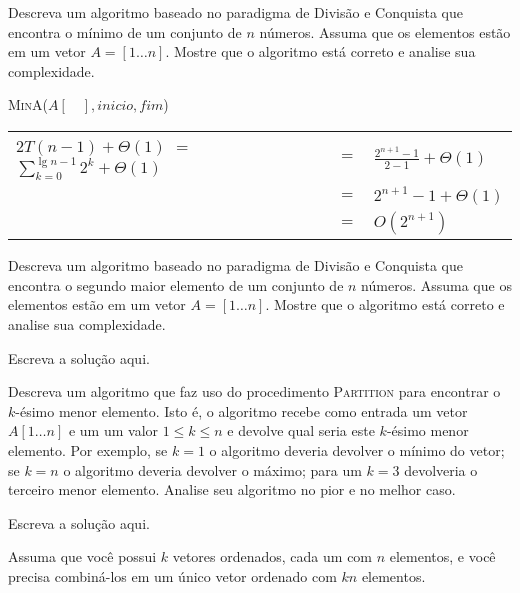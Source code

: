 \documentclass[a4paper]{exam}
\begin{document}
\begin{questions}
  \question Descreva um algoritmo baseado no paradigma de Divisão
  e Conquista que encontra o mínimo de um conjunto de $n$ números.
  Assuma que os elementos estão em um vetor $A = [1\ldots n]$.
  Mostre que o algoritmo está correto e analise sua complexidade.
  \begin{solution}
    \begin{algorithm}[H]
      \NoCaptionOfAlgo
      \DontPrintSemicolon
      \caption{\textsc{MinA}($A[\quad], inicio, fim$)}
    \end{algorithm}
    \begin{tabular}{lll}
        $2T(n-1) + \Theta(1)$ $=$
        $\displaystyle\sum_{k=0}^{\lg n - 1} 2^k + \Theta(1)$
        {}& $=$ &$ \frac{2^{n+1} - 1}{2 - 1} + \Theta(1)$ \\
        {}& $=$ &$ 2^{n+1} -1 + \Theta(1)$ \\
        {}& $=$ &$ O(2^{n+1})$ \\
    \end{tabular}   
  \end{solution}
  \question Descreva um algoritmo baseado no paradigma de Divisão
  e Conquista que encontra o segundo maior elemento de um conjunto
  de $n$ números. Assuma que os elementos estão
  em um vetor $A = [1\ldots n]$. Mostre que o algoritmo está
  correto e analise sua complexidade.
  \begin{solution}
    Escreva a solução aqui.
  \end{solution}
  \question Descreva um algoritmo que faz uso do procedimento
  \textsc{Partition} para encontrar o $k$-ésimo menor elemento.
  Isto é, o algoritmo recebe como entrada um vetor $A[1 \ldots n]$ e um
  um valor $1 \leq k \leq n$ e devolve qual seria este $k$-ésimo
  menor elemento. Por exemplo, se $k = 1$ o algoritmo deveria
  devolver o mínimo do vetor; se $k=n$ o algoritmo deveria devolver
  o máximo; para um $k=3$ devolveria o terceiro menor elemento.
  Analise seu algoritmo no pior e no melhor caso.
  \begin{solution}
    Escreva a solução aqui.
  \end{solution}
  \question Assuma que você possui $k$ vetores ordenados, cada um
  com $n$ elementos, e você precisa combiná-los em um único vetor
  ordenado com $k n$ elementos.
  \begin{parts}

\end{parts}
\end{questions}
\end{document}
